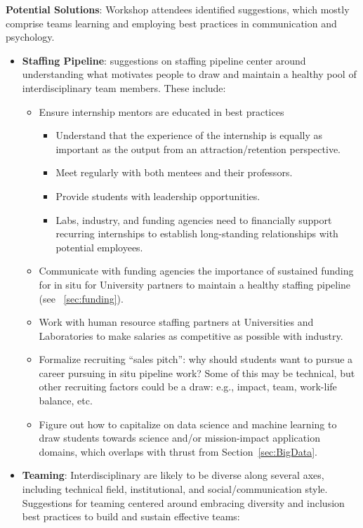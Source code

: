 \textbf{Potential Solutions}:
  Workshop attendees identified suggestions, which mostly comprise teams learning and employing best practices in communication and psychology.
\begin{itemize}
    \item \textbf{Staffing Pipeline}: suggestions on staffing pipeline center around understanding what motivates people to draw and maintain a healthy pool of interdisciplinary team members.  These include:
    \begin{itemize}
        \item Ensure internship mentors are educated in best practices  
        \begin{itemize}
            \item Understand that the experience of the internship is equally as important as the output from an attraction/retention perspective.
            \item  Meet regularly with both mentees and their professors.
            \item  Provide students with leadership opportunities.
            \item  Labs, industry, and funding agencies need to financially support recurring internships to establish long-standing relationships with potential employees.
        \end{itemize}
        \item Communicate with funding agencies the importance of sustained funding for in situ for University partners to maintain a healthy staffing pipeline (see ~\ref{sec:funding}).
        \item Work with human resource staffing partners at Universities and Laboratories to make salaries as competitive as possible with industry.
        \item Formalize recruiting ``sales pitch'': why should students want to pursue a career pursuing in situ pipeline work? Some of this may be technical, but other recruiting factors could be a draw: e.g., impact, team, work-life balance, etc.
        \item Figure out how to capitalize on data science and machine learning to draw students towards science and/or mission-impact application domains, which overlaps with thrust from Section~\ref{sec:BigData}.
    \end{itemize}
    \item \textbf{Teaming}: Interdisciplinary are likely to be diverse along several axes, including technical field, institutional, and social/communication style.  Suggestions for teaming centered around embracing diversity and inclusion best practices to build and sustain effective teams:

\end{itemize}
